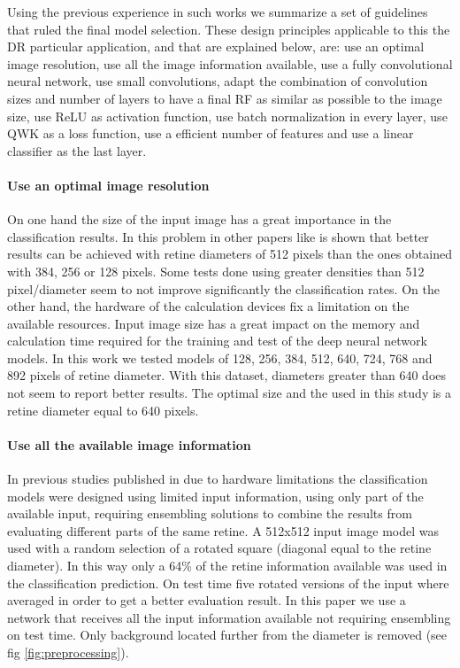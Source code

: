 \documentclass[preprint]{elsarticle}
\theoremstyle{definition} %
\theoremstyle{remark}
\begin{document}
Using the previous experience in such works we summarize a set of guidelines that ruled the final model selection. These design principles applicable to this the DR particular application, and that are explained below, are: use an optimal image resolution, use all the image information available, use a fully convolutional neural network, use small convolutions, adapt the combination of convolution sizes and number of layers to have a final RF as similar as possible to the image size, use ReLU as activation function, use batch normalization in every layer, use QWK as a loss function, use a efficient number of features and use a linear classifier as the last layer.

\paragraph{Use an optimal image resolution} On one hand the size of the input image has a great importance in the classification results. In this problem in other papers like \cite{jdelatorre-2016} is shown that better results can be achieved with retine diameters of 512 pixels than the ones obtained with 384, 256 or 128 pixels. Some tests done using greater densities than 512 pixel/diameter seem to not improve significantly the classification rates. On the other hand, the hardware of the calculation devices fix a limitation on the available resources. Input image size has a great impact on the memory and calculation time required for the training and test of the deep neural network models. In this work we tested models of 128, 256, 384, 512, 640, 724, 768 and 892 pixels of retine diameter. With this dataset, diameters greater than 640 does not seem to report better results. The optimal size and the used in this study is a retine diameter equal to 640 pixels.

\paragraph{Use all the available image information} In previous studies published in \citep{jdelatorre-2016} due to hardware limitations the classification models were designed using limited input information, using only part of the available input, requiring ensembling solutions to combine the results from evaluating different parts of the same retine. A 512x512 input image model was used with a random selection of a rotated square (diagonal equal to the retine diameter). In this way only a 64\% of the retine information available was used in the classification prediction. On test time five rotated versions of the input where averaged in order to get a better evaluation result. In this paper we use a network that receives all the input information available not requiring ensembling on test time. Only background located further from the diameter is removed (see fig \ref{fig:preprocessing}).
\end{document}
